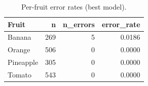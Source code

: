 \begin{table}
\caption{Per-fruit error rates (best model).}
\label{tab:errfruit}
\begin{tabular}{lrrr}
\toprule
Fruit & n & n\_errors & error\_rate \\
\midrule
Banana & 269 & 5 & 0.0186 \\
Orange & 506 & 0 & 0.0000 \\
Pineapple & 305 & 0 & 0.0000 \\
Tomato & 543 & 0 & 0.0000 \\
\bottomrule
\end{tabular}
\end{table}
